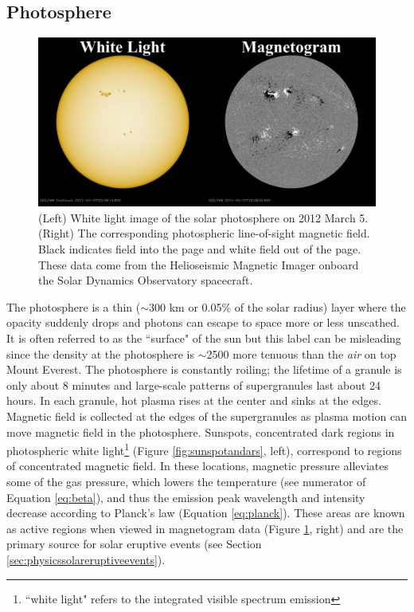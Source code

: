 \subsection{Photosphere}

\begin{figure}[!h]
    \begin{center}
	    \includegraphics[width=\textwidth]{Images/WhiteLightAndMagnetogram.png}
    \end{center}
    \caption[Sunspots and Active Regions]{
        (Left) White light image of the solar photosphere on 2012 March 5. (Right) The corresponding photospheric 
        line-of-sight magnetic field. Black indicates field into the page and white field out of the page. These data
        come from the Helioseismic Magnetic Imager onboard the Solar Dynamics Observatory spacecraft. 
    }
    \label{fig:sunspotsandars}
\end{figure}

The photosphere is a thin ($\sim$300 km or 0.05\% of the solar radius) layer where the opacity suddenly drops and photons can escape to space more or less unscathed. It is often referred to as the ``surface" of the sun but this label can be misleading since the density at the photosphere is $\sim$2500 more tenuous than the \textit{air} on top Mount Everest. The photosphere is constantly roiling; the lifetime of a granule is only about 8 minutes and large-scale patterns of supergranules last about 24 hours. In each granule, hot plasma rises at the center and sinks at the edges. Magnetic field is collected at the edges of the supergranules as plasma motion can move magnetic field in the photosphere. Sunspots, concentrated dark regions in photospheric white light\footnote{``white light" refers to the integrated visible spectrum emission} (Figure \ref{fig:sunspotandars}, left), correspond to regions of concentrated magnetic field. In these locations, magnetic pressure alleviates some of the gas pressure, which lowers the temperature (see numerator of Equation \ref{eq:beta}), and thus the emission peak wavelength and intensity decrease according to Planck's law (Equation \ref{eq:planck}). These areas are known as active regions when viewed in magnetogram data (Figure \ref{fig:sunspotsandars}, right) and are the primary source for solar eruptive events (see Section \ref{sec:physicssolareruptiveevents}). 


